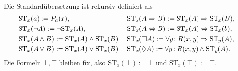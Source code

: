 Die Standardübersetzung ist rekursiv definiert als
\begin{align*}
&\mathrm{ST}_x(a) := P_a(x),
&& \mathrm{ST}_x(A\Rightarrow B) := \mathrm{ST}_x(A)\Rightarrow\mathrm{ST}_x(B),\\
&\mathrm{ST}_x(\lnot A) := \lnot\mathrm{ST}_x(A),
&& \mathrm{ST}_x(A\Leftrightarrow B) := \mathrm{ST}_x(A)\Leftrightarrow\mathrm{ST}_x(b),\\
&\mathrm{ST}_x(A\land B) := \mathrm{ST}_x(A)\land\mathrm{ST}_x(B),
&& \mathrm{ST}_x(\Box A) := \forall y\colon R(x,y)\Rightarrow\mathrm{ST}_y(A),\\
& \mathrm{ST}_x(A\lor B) := \mathrm{ST}_x(A)\lor\mathrm{ST}_x(B),
&& \mathrm{ST}_x(\Diamond A) := \forall y\colon R(x,y)\land\mathrm{ST}_y(A).
\end{align*}
Die Formeln $\bot,\top$ bleiben fix, also
$\mathrm{ST}_x(\bot) := \bot$ und $\mathrm{ST}_x(\top) := \top$.

